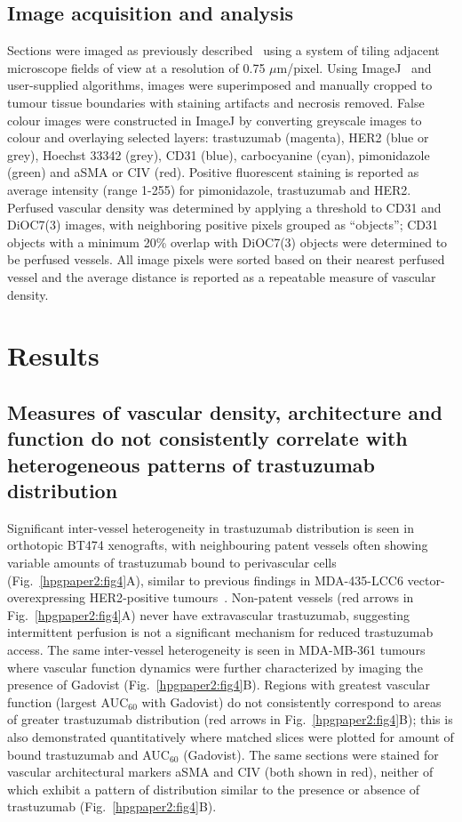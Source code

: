 \subsection{Image acquisition and analysis}
Sections were imaged as previously described~\cite{Kyle:2007ch} using a system of tiling adjacent microscope fields of view at a resolution of 0.75 $\mu$m/pixel.
Using ImageJ~\cite{Collins:2007jr} and user-supplied algorithms, images were superimposed and manually cropped to tumour tissue boundaries with staining artifacts and necrosis removed.
False colour images were constructed in ImageJ by converting greyscale images to colour and overlaying selected layers: trastuzumab (magenta), \acs{HER2} (blue or grey), Hoechst 33342 (grey), CD31 (blue), carbocyanine (cyan), pimonidazole (green) and \acs{aSMA} or \acs{CIV} (red).
Positive fluorescent staining is reported as average intensity (range 1-255) for pimonidazole, trastuzumab and \acs{HER2}.
Perfused vascular density was determined by applying a threshold to CD31 and DiOC7(3) images, with neighboring positive pixels grouped as ``objects''; CD31 objects with a minimum 20\% overlap with DiOC7(3) objects were determined to be perfused vessels.
All image pixels were sorted based on their nearest perfused vessel and the average distance is reported as a repeatable measure of vascular density.

\section{Results}

\subsection{Measures of vascular density, architecture and function do not consistently correlate with heterogeneous patterns of trastuzumab distribution}

Significant inter-vessel heterogeneity in trastuzumab distribution is seen in orthotopic \acs{BT474} xenografts, with neighbouring patent vessels often showing variable amounts of trastuzumab bound to perivascular cells (Fig.~\ref{hpgpaper2:fig4}A), similar to previous findings in MDA-435-LCC6 vector-overexpressing \acs{HER2}-positive tumours~\cite{Baker:2008ci}.
Non-patent vessels (red arrows in Fig.~\ref{hpgpaper2:fig4}A) never have extravascular trastuzumab, suggesting intermittent perfusion is not a significant mechanism for reduced trastuzumab access.
The same inter-vessel heterogeneity is seen in \acs{MDA-MB-361} tumours where vascular function dynamics were further characterized by imaging the presence of Gadovist (Fig.~\ref{hpgpaper2:fig4}B).
Regions with greatest vascular function (largest \acs{AUC}$_{60}$ with Gadovist) do not consistently correspond to areas of greater trastuzumab distribution (red arrows in Fig.~\ref{hpgpaper2:fig4}B); this is also demonstrated quantitatively where matched slices were plotted for amount of bound trastuzumab and \acs{AUC}$_{60}$ (Gadovist).
The same sections were stained for vascular architectural markers \acs{aSMA} and \acs{CIV} (both shown in red), neither of which exhibit a pattern of distribution similar to the presence or absence of trastuzumab (Fig.~\ref{hpgpaper2:fig4}B).

